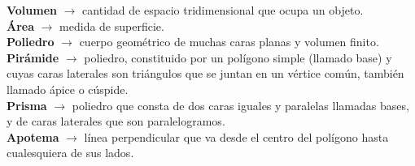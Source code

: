 \begin{defcard}
    \textbf{Volumen}	$\rightarrow$ cantidad de espacio tridimensional que ocupa un objeto.\\
    \textbf{Área} $\rightarrow$ medida de superficie.\\
    \textbf{Poliedro} $\rightarrow$ cuerpo geométrico de muchas caras planas y volumen finito.\\
    \textbf{Pirámide} $\rightarrow$  poliedro, constituido por un polígono simple (llamado base) y cuyas caras laterales son triángulos que se juntan en un vértice común, también llamado ápice o cúspide.\\
    \textbf{Prisma} $\rightarrow$ poliedro que consta de dos caras iguales y paralelas llamadas bases, y de caras laterales que son paralelogramos.\\
    \textbf{Apotema} $\rightarrow$ línea perpendicular que va desde el centro del polígono hasta cualesquiera de sus lados.\\
\end{defcard}